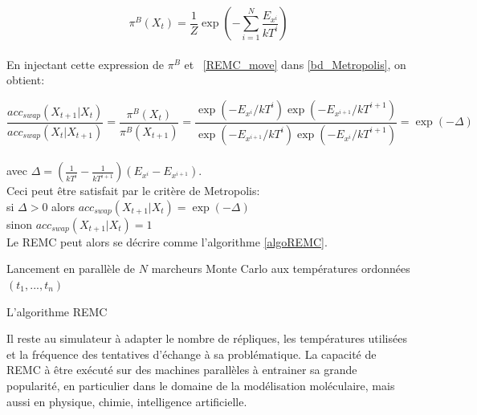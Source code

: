 \begin{equation}
\pi^B(X_t)=\frac{1}{Z} \exp(-\sum_{i=1}^N \frac{E_{x^i}}{kT^i})
\end{equation}\\
En injectant cette expression de $\pi^B$ et ~\ref{REMC_move} dans \ref{bd_Metropolis}, on obtient:


\begin{displaymath}
\frac{acc_{swap}(X_{t+1}|X_t)}{acc_{swap}(X_t|X_{t+1})} =\frac{\pi^B(X_t)}{\pi^B(X_{t+1})}
                                                     = \frac{ \exp(-E_{x^i}/kT^i) \exp(-E_{x^{i+1}}/kT^{i+1})}{\exp(-E_{x^{i+1}}/kT^i) \exp(-E_{x^i}/kT^{i+1})} 
                                                       = \exp(-\Delta) 
\end{displaymath}\\
avec $\Delta = (\frac{1}{kT^i} -\frac{1}{kT^{i+1}})(E_{x^i} - E_{x^{i+1}})$. \\
Ceci peut être satisfait par le critère de Metropolis:\\
si $\Delta >0$ alors $acc_{swap} (X_{t+1}|X_t) = \exp(- \Delta)$ \\
sinon $acc_{swap} (X_{t+1}|X_t) = 1$\\
Le REMC peut alors se décrire comme l'algorithme \ref{algoREMC}.

\begin{algorithm}

  Lancement en parallèle de $N$ marcheurs Monte Carlo aux températures ordonnées $(t_1,...,t_n)$ \;
\caption{L'algorithme REMC}\label{algoREMC}
\end{algorithm}


Il reste au simulateur à adapter le nombre de répliques, les températures utilisées et la fréquence des tentatives d'échange à sa problématique. La capacité de REMC à être exécuté sur des machines parallèles à entrainer sa grande popularité, en particulier dans le domaine de la modélisation moléculaire, mais aussi en physique, chimie, intelligence artificielle.

